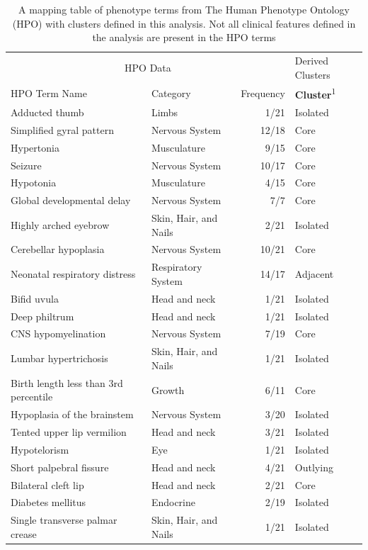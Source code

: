 \documentclass[
  letterpaper,
  DIV=11,
  numbers=noendperiod]{scrartcl}
\begin{document}
\hypertarget{tbl-hpo}{}
\setlength{\LTpost}{0mm}
\begin{longtable}{llrl}
\caption{\label{tbl-hpo}A mapping table of phenotype terms from The Human Phenotype Ontology
(HPO) with clusters defined in this analysis. Not all clinical features
defined in the analysis are present in the HPO terms }\tabularnewline

\toprule
\multicolumn{3}{c}{HPO Data} & Derived Clusters \\ 
\cmidrule(lr){1-3} \cmidrule(lr){4-4}
HPO Term Name & Category & Frequency & \textbf{Cluster}\textsuperscript{1} \\ 
\midrule
Adducted thumb & Limbs & 1/21 & Isolated \\ 
Simplified gyral pattern & Nervous System & 12/18 & Core \\ 
Hypertonia & Musculature & 9/15 & Core \\ 
Seizure & Nervous System & 10/17 & Core \\ 
Hypotonia & Musculature & 4/15 & Core \\ 
Global developmental delay & Nervous System & 7/7 & Core \\ 
Highly arched eyebrow & Skin, Hair, and Nails & 2/21 & Isolated \\ 
Cerebellar hypoplasia & Nervous System & 10/21 & Core \\ 
Neonatal respiratory distress & Respiratory System & 14/17 & Adjacent \\ 
Bifid uvula & Head and neck & 1/21 & Isolated \\ 
Deep philtrum & Head and neck & 1/21 & Isolated \\ 
CNS hypomyelination & Nervous System & 7/19 & Core \\ 
Lumbar hypertrichosis & Skin, Hair, and Nails & 1/21 & Isolated \\ 
Birth length less than 3rd percentile & Growth & 6/11 & Core \\ 
Hypoplasia of the brainstem & Nervous System & 3/20 & Isolated \\ 
Tented upper lip vermilion & Head and neck & 3/21 & Isolated \\ 
Hypotelorism & Eye & 1/21 & Isolated \\ 
Short palpebral fissure & Head and neck & 4/21 & Outlying \\ 
Bilateral cleft lip & Head and neck & 2/21 & Core \\ 
Diabetes mellitus & Endocrine & 2/19 & Isolated \\ 
Single transverse palmar crease & Skin, Hair, and Nails & 1/21 & Isolated \\ 

\end{longtable}
\end{document}
